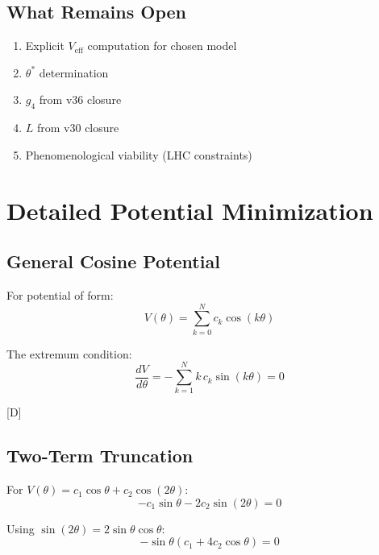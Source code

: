 \documentclass[11pt,a4paper]{article}
\newcommand{\tagD}{\textcolor{blue!70!black}{[D]}}
\begin{document}
\subsection{What Remains Open}

\begin{enumerate}
    \item Explicit $V_{\text{eff}}$ computation for chosen model
    \item $\theta^*$ determination
    \item $g_4$ from v36 closure
    \item $L$ from v30 closure
    \item Phenomenological viability (LHC constraints)
\end{enumerate}

\section{Detailed Potential Minimization}

\subsection{General Cosine Potential}

For potential of form:
\begin{equation}
\label{eq:cosine-pot}
V(\theta) = \sum_{k=0}^{N} c_k \cos(k\theta)
\end{equation}

The extremum condition:
\begin{equation}
\label{eq:extremum-cond}
\frac{dV}{d\theta} = -\sum_{k=1}^{N} k \, c_k \sin(k\theta) = 0
\end{equation}

\tagD

\subsection{Two-Term Truncation}

For $V(\theta) = c_1 \cos\theta + c_2 \cos(2\theta)$:
\begin{equation}
\label{eq:two-term-ext}
-c_1 \sin\theta - 2c_2 \sin(2\theta) = 0
\end{equation}

Using $\sin(2\theta) = 2\sin\theta\cos\theta$:
\begin{equation}
\label{eq:two-term-factored}
-\sin\theta (c_1 + 4c_2 \cos\theta) = 0
\end{equation}
\end{document}
